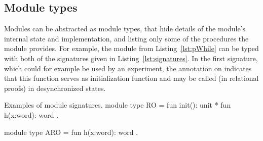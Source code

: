 %
%
%

\subsection{Module types}
Modules can be abstracted as module types, that hide details of the module's
internal state and implementation, and listing only some of the procedures the
module provides. For example, the  module from
Listing~\ref{lst:pWhile} can be typed with both of the signatures given in
Listing~\ref{lst:signatures}. In the first signature, which could for example
be used by an experiment, the \rawec{\{*\}}  annotation on 
indicates that this function serves as initialization function and may be called
(in relational proofs) in desynchronized states.

\begin{easycrypt}[label={lst:signatures}]{Examples of module signatures.}
module type RO = {
  fun init(): unit {*}
  fun h(x:word): word
}.

module type ARO = {
  fun h(x:word): word
}.
\end{easycrypt}

